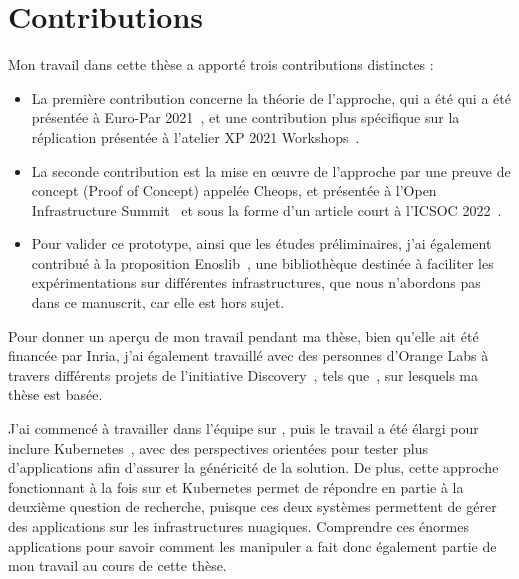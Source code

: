 \section*{Contributions}

Mon travail dans cette thèse a apporté trois contributions distinctes :
\begin{itemize}
\item La première contribution concerne la théorie de l'approche, qui
  a été qui a été présentée à Euro-Par 2021~\cite{CDL21}, et une
  contribution plus spécifique sur la réplication présentée à
  l'atelier XP 2021 Workshops~\cite{DCL21}.

\item La seconde contribution est la mise en œuvre de l'approche par
  une preuve de concept (Proof of Concept) appelée Cheops, et
  présentée à l'Open Infrastructure Summit~\cite{OIS-Berlin22,
    OIS-Berlin22-video} et sous la forme d'un article court à l'ICSOC
  2022~\cite{DAL22true}.

\item Pour valider ce prototype, ainsi que les études préliminaires,
  j'ai également contribué à la proposition Enoslib~\cite{CDVL+21,
    enoslib}, une bibliothèque destinée à faciliter les
  expérimentations sur différentes infrastructures, que nous
  n'abordons pas dans ce manuscrit, car elle est hors sujet.
\end{itemize}


Pour donner un aperçu de mon travail pendant ma thèse, bien qu'elle
ait été financée par Inria, j'ai également travaillé avec des
personnes d'Orange Labs à travers différents projets de l'initiative
Discovery~\cite{discovery}, tels que~\cite{CDVL+21, DCL18, juice,
  ELNC20}, sur lesquels ma thèse est basée.

J'ai commencé à travailler dans l'équipe sur \os, puis le
travail a été élargi pour inclure Kubernetes~\cite{k8s}, avec des
perspectives orientées pour tester plus d'applications afin d'assurer
la généricité de la solution.
%
De plus, cette approche fonctionnant à la fois sur \os et Kubernetes
permet de répondre en partie à la deuxième question de recherche,
puisque ces deux systèmes permettent de gérer des applications sur les
infrastructures nuagiques.
%
Comprendre ces énormes applications pour savoir comment les manipuler
a fait donc également partie de mon travail au cours de cette thèse.





